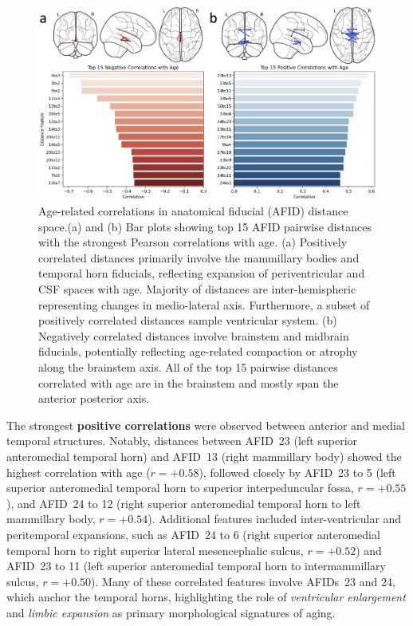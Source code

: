 \begin{figure}[hbt!]
    \centering
    \includegraphics[width=1\linewidth]{figs/ch3_Figure_tsne.png}
    \caption{Age-related correlations in anatomical fiducial (AFID) distance space.(a) and (b) Bar plots showing top 15 AFID pairwise distances with the strongest Pearson correlations with age. (a) Positively correlated distances primarily involve the mammillary bodies and temporal horn fiducials, reflecting expansion of periventricular and CSF spaces with age. Majority of distances are inter-hemispheric representing changes in medio-lateral axis. Furthermore, a subset of positively correlated distances sample ventricular system. (b) Negatively correlated distances involve brainstem and midbrain fiducials, potentially reflecting age-related compaction or atrophy along the brainstem axis. All of the top 15 pairwise distances correlated with age are in the brainstem and mostly span the anterior posterior axis. 
    }
    \label{fig:ch3_Figure_tsne}
\end{figure}

The strongest \textbf{positive correlations} were observed between anterior and medial temporal structures. Notably, distances between AFID~23 (left superior anteromedial temporal horn) and AFID~13 (right mammillary body) showed the highest correlation with age ($r = +0.58$), followed closely by AFID~23 to 5 (left superior anteromedial temporal horn to superior interpeduncular fossa, $r = +0.55$), and AFID~24 to 12 (right superior anteromedial temporal horn to left mammillary body, $r = +0.54$). Additional features included inter-ventricular and peritemporal expansions, such as AFID~24 to 6 (right superior anteromedial temporal horn to right superior lateral mesencephalic sulcus, $r = +0.52$) and AFID~23 to 11 (left superior anteromedial temporal horn to intermammillary sulcus, $r = +0.50$). Many of these correlated features involve AFIDs~23 and 24, which anchor the temporal horns, highlighting the role of \textit{ventricular enlargement} and \textit{limbic expansion} as primary morphological signatures of aging.

